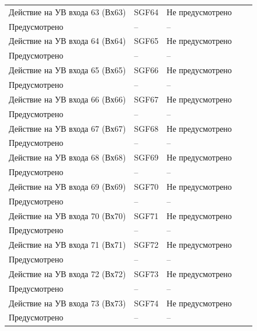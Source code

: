 \begin{longtable}{|>{\centering\arraybackslash}m{5.3cm}|>{\centering\arraybackslash}m{3.3cm}|>{\centering\arraybackslash}m{4.2cm}|>{\centering\arraybackslash}m{1.8cm}|>{\centering\arraybackslash}m{1cm}|}
\hline
\centering Действие на УВ входа 63 (Вх63)  & \centering SGF64 & \centering Не предусмотрено \\ Предусмотрено & \centering -- & \centering \arraybackslash -- \\
\hline
\centering Действие на УВ входа 64 (Вх64)  & \centering SGF65 & \centering Не предусмотрено \\ Предусмотрено & \centering -- & \centering \arraybackslash -- \\
\hline
\centering Действие на УВ входа 65 (Вх65)  & \centering SGF66 & \centering Не предусмотрено \\ Предусмотрено & \centering -- & \centering \arraybackslash -- \\
\hline
\centering Действие на УВ входа 66 (Вх66)  & \centering SGF67 & \centering Не предусмотрено \\ Предусмотрено & \centering -- & \centering \arraybackslash -- \\
\hline
\centering Действие на УВ входа 67 (Вх67)  & \centering SGF68 & \centering Не предусмотрено \\ Предусмотрено & \centering -- & \centering \arraybackslash -- \\
\hline
\centering Действие на УВ входа 68 (Вх68)  & \centering SGF69 & \centering Не предусмотрено \\ Предусмотрено & \centering -- & \centering \arraybackslash -- \\
\hline
\centering Действие на УВ входа 69 (Вх69)  & \centering SGF70 & \centering Не предусмотрено \\ Предусмотрено & \centering -- & \centering \arraybackslash -- \\
\hline
\centering Действие на УВ входа 70 (Вх70)  & \centering SGF71 & \centering Не предусмотрено \\ Предусмотрено & \centering -- & \centering \arraybackslash -- \\
\hline
\centering Действие на УВ входа 71 (Вх71)  & \centering SGF72 & \centering Не предусмотрено \\ Предусмотрено & \centering -- & \centering \arraybackslash -- \\
\hline
\centering Действие на УВ входа 72 (Вх72)  & \centering SGF73 & \centering Не предусмотрено \\ Предусмотрено & \centering -- & \centering \arraybackslash -- \\
\hline
\centering Действие на УВ входа 73 (Вх73)  & \centering SGF74 & \centering Не предусмотрено \\ Предусмотрено & \centering -- & \centering \arraybackslash -- \\

\end{longtable}
